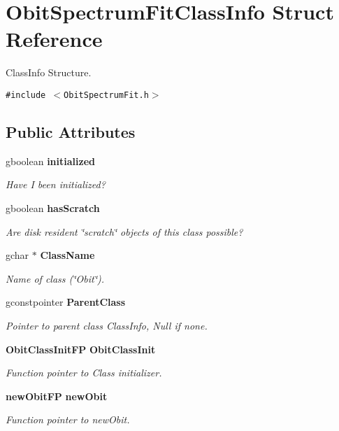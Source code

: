 \section{Obit\-Spectrum\-Fit\-Class\-Info Struct Reference}
\label{structObitSpectrumFitClassInfo}
Class\-Info Structure.  


{\tt \#include $<$Obit\-Spectrum\-Fit.h$>$}

\subsection*{Public Attributes}
\begin{CompactItemize}
\item 
gboolean {\bf initialized}
\begin{CompactList}\small\item\em Have I been initialized? \item\end{CompactList}\item 
gboolean {\bf has\-Scratch}
\begin{CompactList}\small\item\em Are disk resident \char`\"{}scratch\char`\"{} objects of this class possible? \item\end{CompactList}\item 
gchar $\ast$ {\bf Class\-Name}
\begin{CompactList}\small\item\em Name of class (\char`\"{}Obit\char`\"{}). \item\end{CompactList}\item 
gconstpointer {\bf Parent\-Class}
\begin{CompactList}\small\item\em Pointer to parent class Class\-Info, Null if none. \item\end{CompactList}\item 
{\bf Obit\-Class\-Init\-FP} {\bf Obit\-Class\-Init}
\begin{CompactList}\small\item\em Function pointer to Class initializer. \item\end{CompactList}\item 
{\bf new\-Obit\-FP} {\bf new\-Obit}
\begin{CompactList}\small\item\em Function pointer to new\-Obit. \item\end{CompactList}\item 

\end{CompactItemize}
